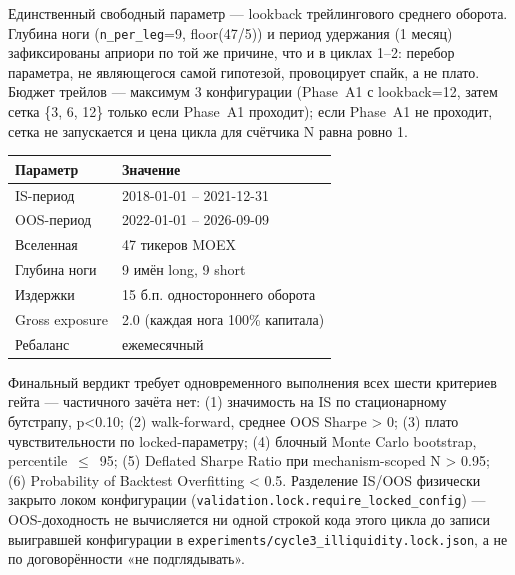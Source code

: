 \documentclass[11pt,a4paper]{article}
\begin{document}
Единственный свободный параметр --- lookback трейлингового среднего оборота. Глубина ноги (\texttt{n\_per\_leg}=9, floor(47/5)) и период удержания (1 месяц) зафиксированы априори по той же причине, что и в циклах 1--2: перебор параметра, не являющегося самой гипотезой, провоцирует спайк, а не плато. Бюджет трейлов --- максимум 3 конфигурации (Phase~A1 с lookback=12, затем сетка \{3, 6, 12\} только если Phase~A1 проходит); если Phase~A1 не проходит, сетка не запускается и цена цикла для счётчика N равна ровно 1.

\begin{center}
\small
\begin{tabular}{ll}
\toprule
Параметр & Значение \\
\midrule
IS-период & 2018-01-01 -- 2021-12-31 \\
OOS-период & 2022-01-01 -- 2026-09-09 \\
Вселенная & 47 тикеров MOEX \\
Глубина ноги & 9 имён long, 9 short \\
Издержки & 15 б.п. одностороннего оборота \\
Gross exposure & 2.0 (каждая нога 100\% капитала) \\
Ребаланс & ежемесячный \\
\bottomrule
\end{tabular}
\end{center}

Финальный вердикт требует одновременного выполнения всех шести критериев гейта --- частичного зачёта нет: (1) значимость на IS по стационарному бутстрапу, p<0.10; (2) walk-forward, среднее OOS Sharpe > 0; (3) плато чувствительности по locked-параметру; (4) блочный Monte Carlo bootstrap, percentile~$\le$~95; (5) Deflated Sharpe Ratio при mechanism-scoped N > 0.95; (6) Probability of Backtest Overfitting < 0.5. Разделение IS/OOS физически закрыто локом конфигурации (\texttt{validation.lock.require\_locked\_config}) --- OOS-доходность не вычисляется ни одной строкой кода этого цикла до записи выигравшей конфигурации в \texttt{experiments/cycle3\_illiquidity.lock.json}, а не по договорённости «не подглядывать».
\end{document}
